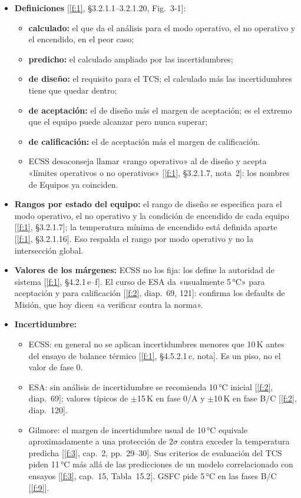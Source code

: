 \documentclass[11pt,a4paper]{article}
\newcommand{\f}[1]{\ref{f:#1}}
\begin{document}
\begin{itemize}
  \item \textbf{Definiciones} [\f{1}, §3.2.1.1--3.2.1.20, Fig.~3-1]:
  \begin{itemize}
    \item \textbf{calculado:} el que da el análisis para el modo operativo, el no operativo y el encendido, en el peor caso;
    \item \textbf{predicho:} el calculado ampliado por las incertidumbres;
    \item \textbf{de diseño:} el requisito para el TCS; el calculado más las incertidumbres tiene que quedar dentro;
    \item \textbf{de aceptación:} el de diseño más el margen de aceptación; es el extremo que el equipo puede alcanzar pero nunca superar;
    \item \textbf{de calificación:} el de aceptación más el margen de calificación.
    \item ECSS desaconseja llamar «rango operativo» al de diseño y acepta «límites operativos o no operativos» [\f{1}, §3.2.1.7, nota~2]: los nombres de Equipos ya coinciden.
  \end{itemize}
  \item \textbf{Rangos por estado del equipo:} el rango de diseño se especifica para el modo operativo, el no operativo y la condición de encendido de cada equipo [\f{1}, §3.2.1.7]; la temperatura mínima de encendido está definida aparte [\f{1}, §3.2.1.16]. Eso respalda el rango por modo operativo y no la intersección global.
  \item \textbf{Valores de los márgenes:} ECSS no los fija: los define la autoridad de sistema [\f{1}, §4.2.1\,e--f]. El curso de ESA da «usualmente 5\,°C» para aceptación y para calificación [\f{2}, diap.~69, 121]: confirma los defaults de Misión, que hoy dicen «a verificar contra la norma».
  \item \textbf{Incertidumbre:}
  \begin{itemize}
    \item ECSS: en general no se aplican incertidumbres menores que 10\,K antes del ensayo de balance térmico [\f{1}, §4.5.2.1\,c, nota]. Es un piso, no el valor de fase 0.
    \item ESA: sin análisis de incertidumbre se recomienda 10\,°C inicial [\f{2}, diap.~69]; valores típicos de $\pm$15\,K en fase 0/A y $\pm$10\,K en fase B/C [\f{2}, diap.~120].
    \item Gilmore: el margen de incertidumbre usual de 10\,°C equivale aproximadamente a una protección de $2\sigma$ contra exceder la temperatura predicha [\f{3}, cap.~2, pp.~29--30]. Sus criterios de evaluación del TCS piden 11\,°C más allá de las predicciones de un modelo correlacionado con ensayos [\f{3}, cap.~15, Tabla~15.2]. GSFC pide 5\,°C en las fases B/C [\f{9}].

\end{itemize}
\end{itemize}
\end{document}
